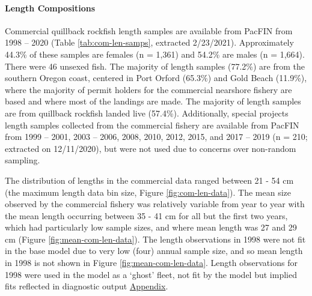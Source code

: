 \documentclass[11pt,
  english,
  a4paper,
]{article}
\begin{document}
\leavevmode\tagmcend\tagstructend\par


\hypertarget{length-compositions}{%
\paragraph{Length Compositions}\label{length-compositions}}

\leavevmode\tagmcend\tagstructend


Commercial quillback rockfish length samples are available from PacFIN from 1998 -- 2020 (Table \ref{tab:com-len-samps}, extracted 2/23/2021). Approximately 44.3\% of these samples are females (n = 1,361) and 54.2\% are males (n = 1,664). There were 46 unsexed fish. The majority of length samples (77.2\%) are from the southern Oregon coast, centered in Port Orford (65.3\%) and Gold Beach (11.9\%), where the majority of permit holders for the commercial nearshore fishery are based and where most of the landings are made. The majority of length samples are from quillback rockfish landed live (57.4\%). Additionally, special projects length samples collected from the commercial fishery are available from PacFIN from 1999 -- 2001, 2003 -- 2006, 2008, 2010, 2012, 2015, and 2017 -- 2019 (n = 210; extracted on 12/11/2020), but were not used due to concerns over non-random sampling.

\leavevmode\tagmcend\tagstructend\par


The distribution of lengths in the commercial data ranged between 21 - 54 cm (the maximum length data bin size, Figure \ref{fig:com-len-data}). The mean size observed by the commercial fishery was relatively variable from year to year with the mean length occurring between 35 - 41 cm for all but the first two years, which had particularly low sample sizes, and where mean length was 27 and 29 cm (Figure \ref{fig:mean-com-len-data}). The length observations in 1998 were not fit in the base model due to very low (four) annual sample size, and so mean length in 1998 is not shown in Figure \ref{fig:mean-com-len-data}. Length observations for 1998 were used in the model as a `ghost' fleet, not fit by the model but implied fits reflected in diagnostic output {\protect\hyperlink{append_a}{Appendix}\leavevmode\tagmcend\tagstructend}.
\end{document}
